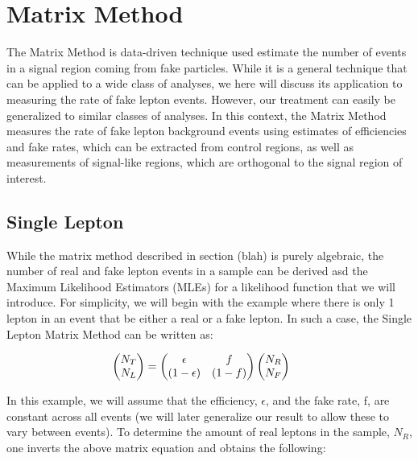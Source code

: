 
\section{Matrix Method}
\label{s:matrix}

The Matrix Method is data-driven technique used estimate the number of events in a signal region coming from fake particles.
While it is a general technique that can be applied to a wide class of analyses, we here will discuss its application to measuring the rate of fake lepton events.
However, our treatment can easily be generalized to similar classes of analyses.
In this context, the Matrix Method measures the rate of fake lepton background events using estimates of efficiencies and fake rates, which can be extracted from control regions, as well as measurements of signal-like regions, which are orthogonal to the signal region of interest.


\subsection{Single Lepton}


While the matrix method described in section (blah) is purely algebraic, the number of real and fake lepton events in a sample can be derived asd the Maximum Likelihood Estimators (MLEs) for a likelihood function that we will introduce.
For simplicity, we will begin with the example where there is only 1 lepton in an event that be either a real or a fake lepton.
In such a case, the Single Lepton Matrix Method can be written as:

\begin{equation}
  \label{eqn:single_lepton_matrix_standard}
  \hspace{-0.5cm}
  \begin{pmatrix}
    N_{T}\\
    N_{L} \\
  \end{pmatrix} 
  = 
  \begin{pmatrix}
    \epsilon & f \\
    (1-\epsilon) & (1-f) \\
  \end{pmatrix}
  \begin{pmatrix}
    N_{R} \\
    N_{F} \\
  \end{pmatrix}
\end{equation}

In this example, we will assume that the efficiency, $\epsilon$, and the fake rate, f, are constant across all events (we will later generalize our result to allow these to vary between events).
To determine the amount of real leptons in the sample, $N_{R}$, one inverts the above matrix equation and obtains the following:

